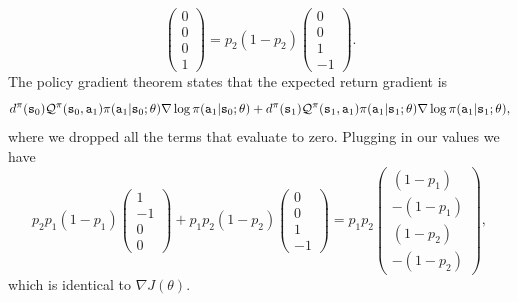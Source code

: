 \begin{example}
\[\begin{pmatrix}0\\0\\0\\1\end{pmatrix} = p_2(1-p_2)\begin{pmatrix}0\\0\\1\\-1\end{pmatrix}.
\]
The policy gradient theorem states that the expected return gradient
is
\[
d^{\pi}({\tt s}_0)\mathcal{Q}^\pi({\tt s}_0,{\tt a}_1)\pi({\tt a}_1|{\tt s}_0;\theta)
\nabla \log \pi({\tt a}_1|{\tt s}_0;\theta) +
d^{\pi}({\tt s}_1)\mathcal{Q}^\pi({\tt s}_1,{\tt a}_1)\pi({\tt a}_1|{\tt s}_1;\theta)
\nabla \log \pi({\tt a}_1|{\tt s}_1;\theta),
\]
where we dropped all the terms that evaluate to zero. Plugging in
our values we have
\[
p_2 p_1 (1-p_1)\begin{pmatrix}1\\-1\\0\\0\end{pmatrix} + p_1 p_2
(1-p_2)\begin{pmatrix}0\\0\\1\\-1\end{pmatrix} = p_1 p_2\begin{pmatrix}(1-p_1)\\
-(1-p_1) \\  (1-p_2) \\ - (1-p_2)\end{pmatrix},
\]
which is identical to $\nabla J(\theta)$.
\end{example}

